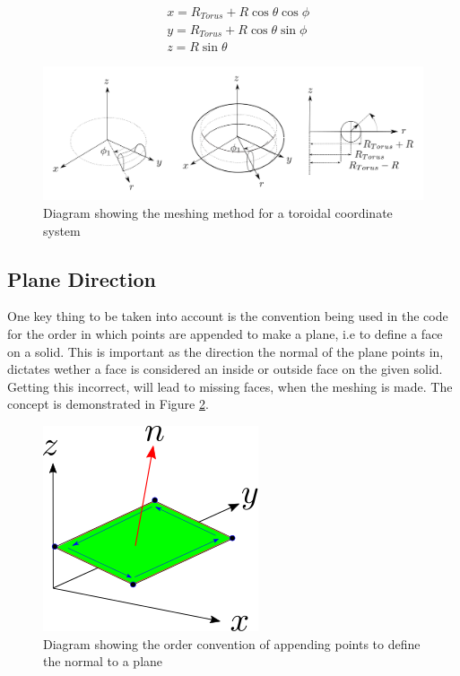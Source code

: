 \documentclass[12pt,a4paper]{article}
\begin{document}
\begin{equation}
\begin{aligned}
& x = R_{Torus} + R\cos{\theta}\cos{\phi} \\
& y = R_{Torus} + R\cos{\theta}\sin{\phi} \\
& z =  R\sin{\theta} 
\end{aligned}
\end{equation}

\begin{figure}[h!]
\centering
\includegraphics[scale=0.35]{Images//Coords/torus_coords.png}
\caption[width=\columnwidth]{Diagram showing the meshing method for a toroidal coordinate system}
\label{tormeshin}
\end{figure}

\subsection{Plane Direction}
One key thing to be taken into account is the convention being used in the code for the order in which points are appended to make a plane, i.e to define a face on a solid. This is important as the direction the normal of the plane points in, dictates wether a face is considered an inside or outside face on the given solid. Getting this incorrect, will lead to missing faces, when the meshing is made. The concept is demonstrated in Figure \ref{pointsorder}.

\begin{figure}[h!]
\centering
\includegraphics[scale=0.75]{Images//append_points//Point_Appending_Order.png}
\caption[width=\columnwidth]{Diagram showing the order convention of appending points to define the normal to a plane}
\label{pointsorder}
\end{figure}
\end{document}
